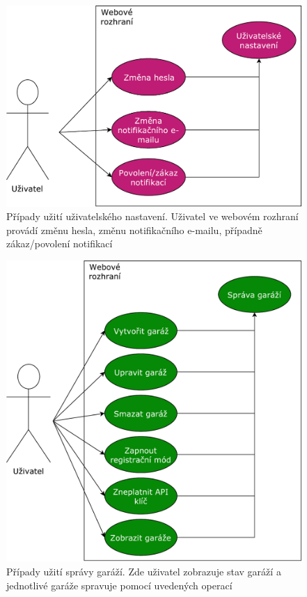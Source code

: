 \begin{figure}[h!]
    \centering
    \includegraphics[width=\textwidth]{images/use_case_user.pdf}
    \caption[Případy užití uživatelského nastavení]{Případy užití uživatelského nastavení. Uživatel ve webovém rozhraní provádí změnu hesla, změnu notifikačního e-mailu, případně zákaz/povolení notifikací}
    \label{fig:use_case_user}
\end{figure}

\begin{figure}[h!]
    \centering
    \includegraphics[width=\textwidth]{images/use_case_garage.pdf}
    \caption[Případy užití správy garáží]{Případy užití správy garáží. Zde uživatel zobrazuje stav garáží a jednotlivé garáže spravuje pomocí uvedených operací}
    \label{fig:use_case_garage}
\end{figure}

